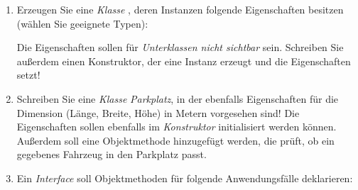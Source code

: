 \documentclass{lehramt-informatik}
\begin{document}
\renewcommand{\labelenumi}{(\alph{enumi})}
\renewcommand{\labelenumii}{(\roman{enumii})}
\begin{enumerate}


\item Erzeugen Sie eine \emph{Klasse} , deren Instanzen
folgende Eigenschaften besitzen (wählen Sie geeignete Typen):


Die Eigenschaften sollen für \emph{Unterklassen nicht sichtbar} sein.
Schreiben Sie außerdem einen Konstruktor, der eine Instanz erzeugt und
die Eigenschaften setzt!

\begin{antwort}
\end{antwort}


\item Schreiben Sie eine \emph{Klasse} \emph{Parkplatz}, in der
ebenfalls Eigenschaften für die Dimension (Länge, Breite, Höhe) in
Metern vorgesehen sind! Die Eigenschaften sollen ebenfalls im
\emph{Konstruktor} initialisiert werden können. Außerdem soll eine
Objektmethode hinzugefügt werden, die prüft, ob ein gegebenes Fahrzeug
in den Parkplatz passt.

\begin{antwort}
\end{antwort}


\item Ein \emph{Interface}  soll Objektmethoden für
folgende Anwendungsfälle deklarieren:

\begin{enumerate}



\end{enumerate}
\end{enumerate}
\end{document}
